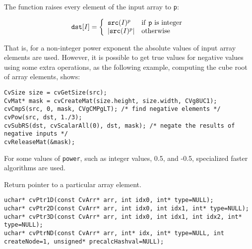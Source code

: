 The function raises every element of the input array to \texttt{p}:

\[
\texttt{dst} [I] = \left\{ \begin{array}{l l} \texttt{src}(I)^p & \mbox{if \texttt{p} is integer}\\ |\texttt{src}(I)^p| & \mbox{otherwise}\\ \end{array} \right.
\]

That is, for a non-integer power exponent the absolute values of input array elements are used. However, it is possible to get true values for negative values using some extra operations, as the following example, computing the cube root of array elements, shows:

\begin{lstlisting}
CvSize size = cvGetSize(src);
CvMat* mask = cvCreateMat(size.height, size.width, CVg8UC1);
cvCmpS(src, 0, mask, CVgCMPgLT); /* find negative elements */
cvPow(src, dst, 1./3);
cvSubRS(dst, cvScalarAll(0), dst, mask); /* negate the results of negative inputs */
cvReleaseMat(&mask);
\end{lstlisting}

For some values of \texttt{power}, such as integer values, 0.5, and -0.5, specialized faster algorithms are used.

\ifC
{}
Return pointer to a particular array element.

\begin{lstlisting}
uchar* cvPtr1D(const CvArr* arr, int idx0, int* type=NULL);
uchar* cvPtr2D(const CvArr* arr, int idx0, int idx1, int* type=NULL);
uchar* cvPtr3D(const CvArr* arr, int idx0, int idx1, int idx2, int* type=NULL);
uchar* cvPtrND(const CvArr* arr, int* idx, int* type=NULL, int createNode=1, unsigned* precalcHashval=NULL);
\end{lstlisting}

\begin{description}
\end{description}


